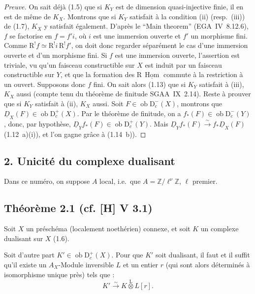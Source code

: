 \documentclass[11pt]{article}
\DeclareMathOperator{\Hom}{Hom}
\newcommand{\R}{\mathrm{R}}
\newcommand{\D}{\mathrm{D}}
\newcommand{\Z}{\mathbb{Z}}
\newcommand{\ob}{\operatorname{ob}}
\providecommand{\Hom}{\operatorname{Hom}}
\providecommand{\ob}{\operatorname{ob}}
\providecommand{\R}{\mathrm R}
\providecommand{\Z}{\mathbb Z}
\providecommand{\Hom}{\operatorname{Hom}}
\begin{document}
\begin{proof}[Preuve]
On sait déjà (1.5) que si $K_Y$ est de dimension quasi-injective finie, il en est de même de $K_X$. Montrons que si $K_Y$ satisfait à la condition (ii) (resp.~(iii)) de (1.7), $K_X$ y satisfait également. D'après le ``Main theorem'' (EGA~IV~8.12.6), $f$ se factorise en $f = f'i$, où $i$ est une immersion ouverte et $f'$ un morphisme fini. Comme $\R^{!}f \simeq \R^{!}i \, \R^{!}f'$, on doit donc regarder séparément le cas d'une immersion ouverte et d'un morphisme fini. Si $f$ est une immersion ouverte, l'assertion est triviale, vu qu'un faisceau constructible sur $X$ est induit par un faisceau constructible sur $Y$, et que la formation des $\R\,\underline{\Hom}$ commute à la restriction à un ouvert. Supposons donc $f$ fini. On sait alors (1.13) que si $K_Y$ satisfait à (iii), $K_X$ aussi (compte tenu du théorème de finitude SGAA~IX~2.14). Reste à prouver que si $K_Y$ satisfait à (ii), $K_X$ aussi. Soit $F \in \ob \D_c^{-}(X)$, montrons que $\underline{D}_X(F) \in \ob \D_c^{+}(X)$. Par le théorème de finitude, on a $f_{*}(F) \in \ob \D_c^{-}(Y)$, donc, par hypothèse, $\underline{D}_Y f_{*}(F) \in \ob \D_c^{+}(Y)$. Mais $\underline{D}_Y f_{*}(F) \xrightarrow{\sim} f_{*}\underline{D}_X(F)$ (1.12~a)(i)), et l'on gagne grâce à (1.14~b)).
\end{proof}

\subsection{2. Unicité du complexe dualisant}

Dans ce numéro, on suppose $A$ local, i.e.~que $A = \Z/\ell^{\nu}\Z$, $\ell$ premier.

\subsection*{Théorème 2.1 (cf. [H] V 3.1)}
Soit $X$ un préschéma (localement noethérien) connexe, et soit $K$ un complexe dualisant sur $X$ (1.6).

Soit d'autre part $K' \in \ob \D_c^{+}(X)$. Pour que $K'$ soit dualisant, il faut et il suffit qu'il existe un $A_X$-Module inversible $L$ et un entier $r$ (qui sont alors déterminés à isomorphisme unique près) tels que :
\[
K' \xrightarrow{\sim} K \mathop{\otimes}\limits^{\mathrm{L}} L[r].
\]
\end{document}
